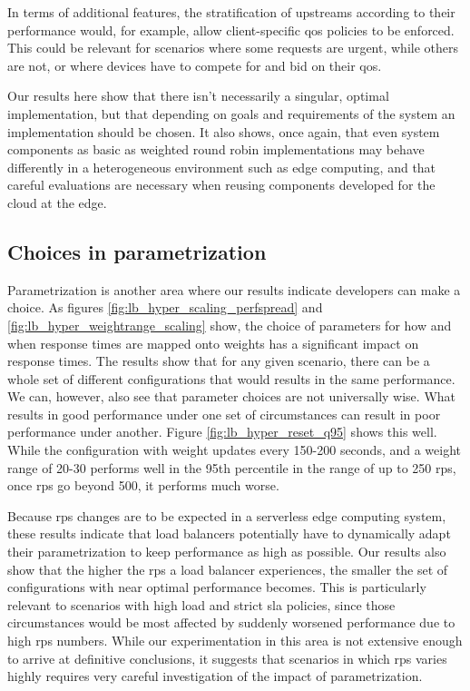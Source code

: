 In terms of additional features, the stratification of upstreams according to their performance would, for example, allow client-specific \gls{qos} policies to be enforced.
This could be relevant for scenarios where some requests are urgent, while others are not, or where devices have to compete for and bid on their \gls{qos}.

Our results here show that there isn't necessarily a singular, optimal implementation, but that depending on goals and requirements of the system an implementation should be chosen.
It also shows, once again, that even system components as basic as weighted round robin implementations may behave differently in a heterogeneous environment such as edge computing, and that careful evaluations are necessary when reusing components developed for the cloud at the edge.

\subsection{Choices in parametrization}
Parametrization is another area where our results indicate developers can make a choice.
As figures \ref{fig:lb_hyper_scaling_perfspread} and \ref{fig:lb_hyper_weightrange_scaling} show, the choice of parameters for how and when response times are mapped onto weights has a significant impact on response times.
The results show that for any given scenario, there can be a whole set of different configurations that would results in the same performance.
We can, however, also see that parameter choices are not universally wise.
What results in good performance under one set of circumstances can result in poor performance under another.
Figure \ref{fig:lb_hyper_reset_q95} shows this well.
While the configuration with weight updates every 150-200 seconds, and a weight range of 20-30 performs well in the 95th percentile in the range of up to 250 \gls{rps}, once \gls{rps} go beyond 500, it performs much worse.

Because \gls{rps} changes are to be expected in a serverless edge computing system, these results indicate that load balancers potentially have to dynamically adapt their parametrization to keep performance as high as possible.
Our results also show that the higher the \gls{rps} a load balancer experiences, the smaller the set of configurations with near optimal performance becomes.
This is particularly relevant to scenarios with high load and strict \gls{sla} policies, since those circumstances would be most affected by suddenly worsened performance due to high \gls{rps} numbers.
While our experimentation in this area is not extensive enough to arrive at definitive conclusions, it suggests that scenarios in which \gls{rps} varies highly requires very careful investigation of the impact of parametrization.


